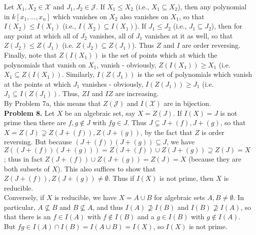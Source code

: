 \documentclass[11pt]{article}
\newcommand{\num}[1]{\noindent \textbf{#1}}
\theoremstyle{definition}
\begin{document}
Let $X_1,X_2\in\mathcal{X}$ and $J_1,J_2\in\mathcal{J}$. If $X_1\leq X_2$
(i.e., $X_1\subseteq X_2$), then any polynomial in $k[x_1,\ldots,x_n]$ which
vanishes on $X_2$ also vanishes on $X_1$, so that $I(X_2)\leq I(X_1)$ (i.e.,
$I(X_2)\subseteq I(X_1)$). If $J_1\leq J_2$ (i.e., $J_1\subseteq J_2$), then
for any point at which all of $J_2$ vanishes, all of $J_1$ vanishes at it as
well, so that $Z(J_2)\leq Z(J_1)$ (i.e. $Z(J_2)\subseteq Z(J_1)$). Thus $Z$
and $I$ are order reversing. Finally, note that $Z(I(X_1))$ is the set of
points which at which the polynomials that vanish on $X_1$, vanish - obviously,
$Z(I(X_1))\geq X_1$ (i.e. $X_1\subseteq Z(I(X_1))$. Similarly, $I(Z(J_1))$
is the set of polynomials which vanish at the points at which $J_1$ vanishes
- obviously, $I(Z(J_1))\geq J_1$ (i.e. $J_1\subseteq I(Z(J_1))$. Thus, $ZI$
and $IZ$ are increasing. \\

By Problem 7a, this means that $Z(\mathcal{J})$ and $I(\mathcal{X})$ are in
bijection.\\

\num{Problem 8.} Let $X$ be an algebraic set, say $X=Z(J)$. If $I(X)=J$ is
not prime then there are $f,g\notin J$ with $fg\in J$. Thus $J\subsetneq
J+(f), J+(g)$, so that $X=Z(J)\supsetneq Z(J+(f)),Z(J+(g))$, by the fact
that $Z$ is order reversing. But because $(J+(f))(J+(g))\subseteq J$, we
have $Z((J+(f))(J+(g)))=Z(J+(f))\cup Z(J+(g))\supseteq Z(J)=X$; thus in fact
$Z(J+(f))\cup Z(J+(g)) =Z(J)=X$ (because they are both subsets of $X$). This
also suffices to show that $Z(J+(f)),Z(J+(g))\neq\emptyset$. Thus if $I(X)$
is not prime, then $X$ is reducible.\\

Conversely, if $X$ is reducible, we have $X=A\cup B$ for algebraic sets
$A,B\neq\emptyset$. In particular, $A\not\subseteq B$ and $B\not\subseteq
A$, and thus $I(A)\not\supseteq I(B)$ and $I(B)\not\supseteq I(A)$, so that
there is an $f\in I(A)$ with $f\notin I(B)$ and a $g\in I(B)$ with $g\notin
I(A)$. But $fg\in I(A)\cap I(B) = I(A\cup B)=I(X)$, so $I(X)$ is not prime.
\end{document}
